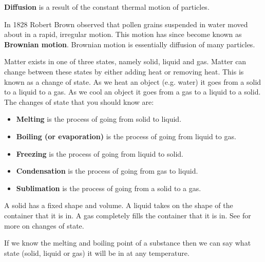 \par 
\label{m38736*id10987324}\textbf{Diffusion} is a result of the constant thermal motion of particles. 
\par 
\label{m38736*id0128031}In 1828 Robert Brown observed that pollen grains suspended in water moved about in a rapid, irregular motion. This motion has since become known as \textbf{Brownian motion}. Brownian motion is essentially diffusion of many particles.
\par 
\label{m38736*id48327}Matter exists in one of three states, namely solid, liquid and gas. Matter can change between these states by either adding heat or removing heat. This is known as a change of state. As we heat an object (e.g. water) it goes from a solid to a liquid to a gas. As we cool an object it goes from a gas to a liquid to a solid.
The changes of state that you should know are:
\label{m38736*id02341}\begin{itemize}[noitemsep]
\item \textbf{Melting} is the process of going from solid to liquid.
\item \textbf{Boiling (or evaporation)} is the process of going from liquid to gas.
\item \textbf{Freezing} is the process of going from liquid to solid.
\item \textbf{Condensation} is the process of going from gas to liquid.
\item \textbf{Sublimation} is the process of going from a solid to a gas. \end{itemize}
A solid has a fixed shape and volume. A liquid takes on the shape of the container that it is in. A gas completely fills the container that it is in. See for more on changes of state.
\par \label{m38736*eip-957}If we know the melting and boiling point of a substance then we can say what state (solid, liquid or gas) it will be in at any temperature. \par \label{m38736*eip-232}
